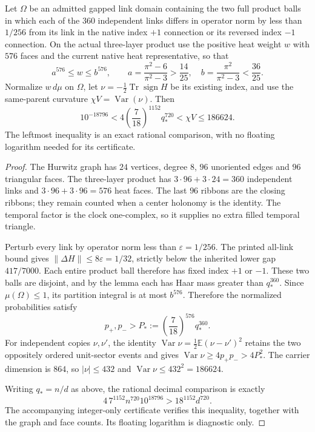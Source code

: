 \documentclass[12pt,a4paper]{article}
\begin{document}
\begin{theorem}
\label{p10:thm:next187-native-heat-interval}
Let $\Omega$ be an admitted gapped link domain containing the two full
product balls in which each of the $360$ independent links differs in
operator norm by less than $1/256$ from its link in the native index $+1$
connection or its reversed index $-1$ connection. On the actual
three-layer product use the positive
heat weight $w$ with $576$ faces and the current native heat representative,
so that
\[
 a^{576}\le w\le b^{576},\qquad
 a=\frac{\pi^2-6}{\pi^2-3}>\frac{14}{25},\quad
 b=\frac{\pi^2}{\pi^2-3}<\frac{36}{25}.
\]
Normalize $w\,d\mu$ on $\Omega$, let $\nu=-\tfrac12\operatorname{Tr}
\operatorname{sign}H$ be its existing index, and use the same-parent curvature
$\chi V=\operatorname{Var}(\nu)$. Then
\[
 10^{-18796}<4\left(\frac7{18}\right)^{1152}q_*^{720}
       <\chi V\le186624.
\]
The leftmost inequality is an exact rational comparison, with no floating
logarithm needed for its certificate.
\end{theorem}
\begin{proof}
The Hurwitz graph has $24$ vertices, degree $8$, $96$ unoriented edges and
$96$ triangular faces. The three-layer product has $3\cdot96+3\cdot24=360$
independent links and $3\cdot96+3\cdot96=576$ heat faces. The last $96$
ribbons are the closing ribbons; they remain counted when a center holonomy
is the identity. The temporal factor is the clock one-complex, so it supplies
no extra filled temporal triangle.

Perturb every link by operator norm less than $\varepsilon=1/256$. The
printed all-link bound gives $\|\Delta H\|\le8\varepsilon=1/32$, strictly
below the inherited lower gap $417/7000$. Each entire product ball therefore
has fixed index $+1$ or $-1$. These two balls are disjoint, and by the lemma
each has Haar mass greater than $q_*^{360}$. Since $\mu(\Omega)\le1$, its
partition integral is at most $b^{576}$. Therefore the normalized
probabilities satisfy
\[
 p_+,p_->P_*:=\left(\frac7{18}\right)^{576}q_*^{360}.
\]
For independent copies $\nu,\nu'$, the identity
$\operatorname{Var}\nu=\tfrac12\mathbb E(\nu-\nu')^2$ retains the two
oppositely ordered unit-sector events and gives
$\operatorname{Var}\nu\ge4p_+p_->4P_*^2$.
The carrier dimension is $864$, so $|\nu|\le432$ and
$\operatorname{Var}\nu\le432^2=186624$.

Writing $q_*=n/d$ as above, the rational decimal comparison is exactly
\[
 4\,7^{1152}n^{720}10^{18796}>18^{1152}d^{720}.
\]
The accompanying integer-only certificate verifies this inequality, together
with the graph and face counts. Its floating logarithm is diagnostic only.
\end{proof}
\end{document}
